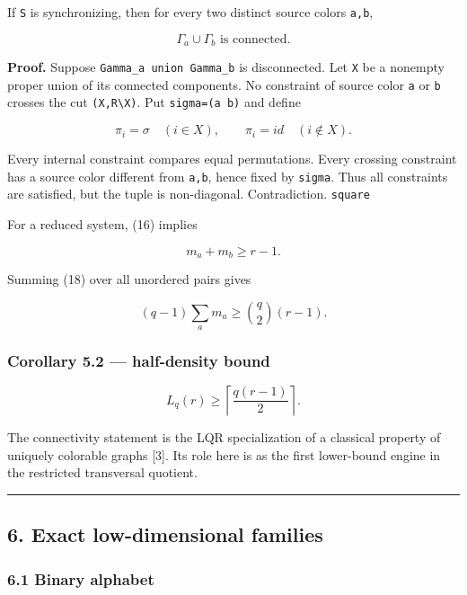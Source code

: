 If \texttt{S} is synchronizing, then for every two distinct source
colors \texttt{a,b},

\[
\boxed{\Gamma_a\cup\Gamma_b\text{ is connected}.}
\tag{16}
\]

\textbf{Proof.} Suppose \texttt{Gamma\_a\ union\ Gamma\_b} is
disconnected. Let \texttt{X} be a nonempty proper union of its connected
components. No constraint of source color \texttt{a} or \texttt{b}
crosses the cut \texttt{(X,R\textbackslash{}X)}. Put
\texttt{sigma=(a\ b)} and define

\[
\pi_i=\sigma\quad(i\in X),
\qquad
\pi_i=id\quad(i\notin X).
\tag{17}
\]

Every internal constraint compares equal permutations. Every crossing
constraint has a source color different from \texttt{a,b}, hence fixed
by \texttt{sigma}. Thus all constraints are satisfied, but the tuple is
non-diagonal. Contradiction. \texttt{square}

For a reduced system, (16) implies

\[
m_a+m_b\ge r-1.
\tag{18}
\]

Summing (18) over all unordered pairs gives

\[
(q-1)\sum_a m_a\ge\binom q2(r-1).
\]

\hypertarget{corollary-5.2-half-density-bound}{%
\subsubsection{Corollary 5.2 --- half-density
bound}\label{corollary-5.2-half-density-bound}}

\[
\boxed{
L_q(r)\ge\left\lceil\frac{q(r-1)}2\right\rceil.
}
\tag{19}
\]

The connectivity statement is the LQR specialization of a classical
property of uniquely colorable graphs {[}3{]}. Its role here is as the
first lower-bound engine in the restricted transversal quotient.

\begin{center}\rule{0.5\linewidth}{0.5pt}\end{center}

\hypertarget{exact-low-dimensional-families}{%
\subsection{6. Exact low-dimensional
families}\label{exact-low-dimensional-families}}

\hypertarget{binary-alphabet}{%
\subsubsection{6.1 Binary alphabet}\label{binary-alphabet}}

